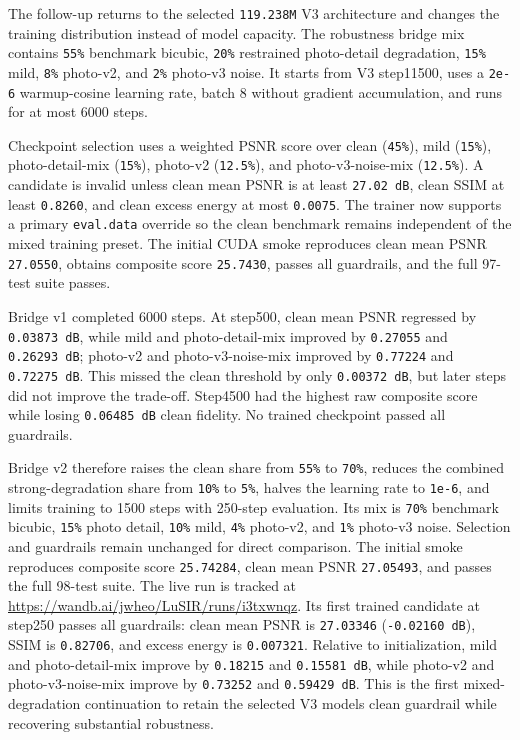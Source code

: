 \documentclass[
  10pt,
]{article}
\begin{document}
The follow-up returns to the selected \texttt{119.238M} V3 architecture
and changes the training distribution instead of model capacity. The
robustness bridge mix contains \texttt{55\%} benchmark bicubic,
\texttt{20\%} restrained photo-detail degradation, \texttt{15\%} mild,
\texttt{8\%} photo-v2, and \texttt{2\%} photo-v3 noise. It starts from
V3 step11500, uses a \texttt{2e-6} warmup-cosine learning rate, batch 8
without gradient accumulation, and runs for at most 6000 steps.

Checkpoint selection uses a weighted PSNR score over clean
(\texttt{45\%}), mild (\texttt{15\%}), photo-detail-mix (\texttt{15\%}),
photo-v2 (\texttt{12.5\%}), and photo-v3-noise-mix (\texttt{12.5\%}). A
candidate is invalid unless clean mean PSNR is at least
\texttt{27.02\ dB}, clean SSIM at least \texttt{0.8260}, and clean
excess energy at most \texttt{0.0075}. The trainer now supports a
primary \texttt{eval.data} override so the clean benchmark remains
independent of the mixed training preset. The initial CUDA smoke
reproduces clean mean PSNR \texttt{27.0550}, obtains composite score
\texttt{25.7430}, passes all guardrails, and the full 97-test suite
passes.

Bridge v1 completed 6000 steps. At step500, clean mean PSNR regressed by
\texttt{0.03873\ dB}, while mild and photo-detail-mix improved by
\texttt{0.27055} and \texttt{0.26293\ dB}; photo-v2 and
photo-v3-noise-mix improved by \texttt{0.77224} and
\texttt{0.72275\ dB}. This missed the clean threshold by only
\texttt{0.00372\ dB}, but later steps did not improve the trade-off.
Step4500 had the highest raw composite score while losing
\texttt{0.06485\ dB} clean fidelity. No trained checkpoint passed all
guardrails.

Bridge v2 therefore raises the clean share from \texttt{55\%} to
\texttt{70\%}, reduces the combined strong-degradation share from
\texttt{10\%} to \texttt{5\%}, halves the learning rate to
\texttt{1e-6}, and limits training to 1500 steps with 250-step
evaluation. Its mix is \texttt{70\%} benchmark bicubic, \texttt{15\%}
photo detail, \texttt{10\%} mild, \texttt{4\%} photo-v2, and
\texttt{1\%} photo-v3 noise. Selection and guardrails remain unchanged
for direct comparison. The initial smoke reproduces composite score
\texttt{25.74284}, clean mean PSNR \texttt{27.05493}, and passes the
full 98-test suite. The live run is tracked at
\url{https://wandb.ai/jwheo/LuSIR/runs/i3txwnqz}. Its first trained
candidate at step250 passes all guardrails: clean mean PSNR is
\texttt{27.03346} (\texttt{-0.02160\ dB}), SSIM is \texttt{0.82706}, and
excess energy is \texttt{0.007321}. Relative to initialization, mild and
photo-detail-mix improve by \texttt{0.18215} and \texttt{0.15581\ dB},
while photo-v2 and photo-v3-noise-mix improve by \texttt{0.73252} and
\texttt{0.59429\ dB}. This is the first mixed-degradation continuation
to retain the selected V3 model\textquotesingle s clean guardrail while
recovering substantial robustness.
\end{document}
